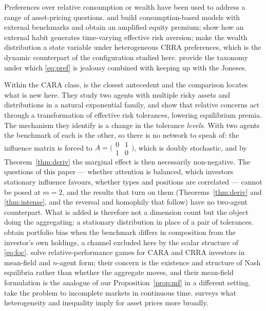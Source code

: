 \documentclass[12pt]{article}
\theoremstyle{definition}
\theoremstyle{remark}
\begin{document}
Preferences over relative consumption or wealth have been used to address a
range of asset-pricing questions. \cite{abel} and \cite{gali} build
consumption-based models with external benchmarks and obtain an amplified
equity premium; \cite{campbell} show how an external habit generates
time-varying effective risk aversion; \cite{chankogan} make the wealth
distribution a state variable under heterogeneous CRRA preferences, which is
the dynamic counterpart of the configuration studied here. \cite{dupor}
provide the taxonomy under which \eqref{eq:pref} is jealousy combined with
keeping up with the Joneses.

Within the CARA class, \cite{degennaro} is the closest antecedent and the
comparison locates what is new here. They study two agents with multiple risky
assets and distributions in a natural exponential family, and show that relative
concerns act through a transformation of effective risk tolerances, lowering
equilibrium premia. The mechanism they identify is a change in the tolerance
\emph{levels}. With two agents the benchmark of each is the other, so there is
no network to speak of: the influence matrix is forced to
$A=\big(\begin{smallmatrix}0&1\\1&0\end{smallmatrix}\big)$, which is doubly
stochastic, and by Theorem~\ref{thm:deriv} the marginal effect is then
necessarily non-negative. The questions of this paper --- whether attention is
balanced, which investors stationary influence favours, whether types and
positions are correlated --- cannot be posed at $m=2$, and the results that turn
on them (Theorems~\ref{thm:deriv} and \ref{thm:intense}, and the reversal and
homophily that follow) have no two-agent counterpart. What is added is therefore
not a dimension count but the object doing the aggregating: a stationary
distribution in place of a pair of tolerances. \cite{demarzo04} obtain portfolio bias when
the benchmark differs in composition from the investor's own holdings, a
channel excluded here by the scalar structure of \eqref{eq:foc}.
\cite{lacker} solve relative-performance games for CARA and CRRA investors in
mean-field and $n$-agent form; their concern is the existence and structure of
Nash equilibria rather than whether the aggregate moves, and their mean-field
formulation is the analogue of our Proposition~\ref{prop:mf} in a different
setting. \cite{kraft} take the problem to incomplete markets in continuous
time. \cite{panageas} surveys what heterogeneity and inequality imply for asset
prices more broadly.
\end{document}

